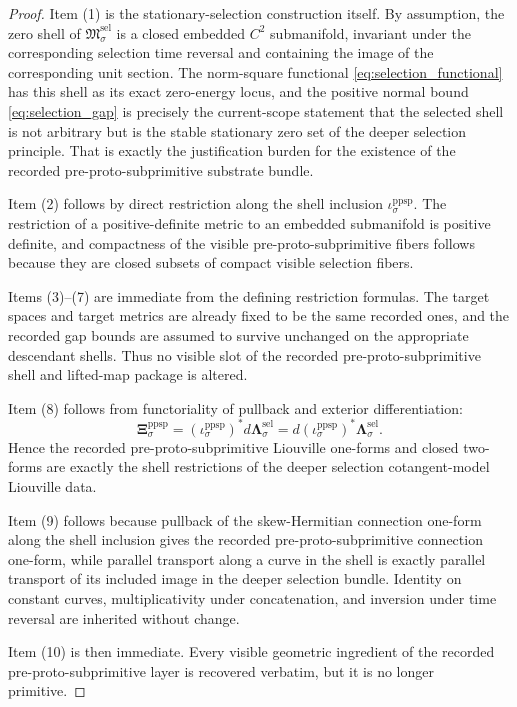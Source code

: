 \documentclass[11pt]{article}
\newcommand{\PreProtoSubprimInc}[1]{\iota_{#1}^{\mathrm{ppsp}}}
\newcommand{\PreProtoSubprimTwo}[1]{\boldsymbol{\Xi}_{#1}^{\mathrm{ppsp}}}
\newcommand{\SelSection}[1]{\mathfrak M_{#1}^{\mathrm{sel}}}
\newcommand{\SelLiouville}[1]{\boldsymbol{\Lambda}_{#1}^{\mathrm{sel}}}
\begin{document}
\begin{proof}
Item (1) is the stationary-selection construction itself. By assumption, the zero shell of \(\SelSection{\sigma}\) is a closed embedded \(C^2\) submanifold, invariant under the corresponding selection time reversal and containing the image of the corresponding unit section. The norm-square functional \eqref{eq:selection_functional} has this shell as its exact zero-energy locus, and the positive normal bound \eqref{eq:selection_gap} is precisely the current-scope statement that the selected shell is not arbitrary but is the stable stationary zero set of the deeper selection principle. That is exactly the justification burden for the existence of the recorded pre-proto-subprimitive substrate bundle.

Item (2) follows by direct restriction along the shell inclusion \(\PreProtoSubprimInc{\sigma}\). The restriction of a positive-definite metric to an embedded submanifold is positive definite, and compactness of the visible pre-proto-subprimitive fibers follows because they are closed subsets of compact visible selection fibers.

Items (3)--(7) are immediate from the defining restriction formulas. The target spaces and target metrics are already fixed to be the same recorded ones, and the recorded gap bounds are assumed to survive unchanged on the appropriate descendant shells. Thus no visible slot of the recorded pre-proto-subprimitive shell and lifted-map package is altered.

Item (8) follows from functoriality of pullback and exterior differentiation:
\[
\PreProtoSubprimTwo{\sigma}
=
(\PreProtoSubprimInc{\sigma})^*d\SelLiouville{\sigma}
=
d(\PreProtoSubprimInc{\sigma})^*\SelLiouville{\sigma}.
\]
Hence the recorded pre-proto-subprimitive Liouville one-forms and closed two-forms are exactly the shell restrictions of the deeper selection cotangent-model Liouville data.

Item (9) follows because pullback of the skew-Hermitian connection one-form along the shell inclusion gives the recorded pre-proto-subprimitive connection one-form, while parallel transport along a curve in the shell is exactly parallel transport of its included image in the deeper selection bundle. Identity on constant curves, multiplicativity under concatenation, and inversion under time reversal are inherited without change.

Item (10) is then immediate. Every visible geometric ingredient of the recorded pre-proto-subprimitive layer is recovered verbatim, but it is no longer primitive.
\end{proof}
\end{document}
